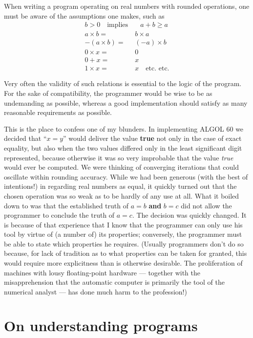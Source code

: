 When writing a program operating on real numbers with rounded operations, one must be aware of the assumptions one makes, such as
\begin{equation*}
	\begin{split}
		b > 0\quad \text{implies}&\quad a + b \geqslant a\\
		a\times b =&\ b\times a\\
		-(a \times  b) =&\ (-a)\times b\\
		0\times  x =&\ 0\\
		0 + x =&\ x\\
		1\times x =&\ x\quad\text{etc. etc.}
	\end{split}
\end{equation*}

Very often the validity of such relations is essential to the logic of the program. For the sake of compatibility, the programmer would be wise to be as undemanding as possible, whereas a good implementation should satisfy as many reasonable requirements as possible.

This is the place to confess one of my blunders. In implementing ALGOL 60 we decided that ``$x = y$'' would deliver the value \textbf{true} not only in the case of exact equality, but also when the two values differed only in the least significant digit represented, because otherwise it was so very improbable that the value \textit{true} would ever be computed. We were thinking of converging iterations that could oscillate within rounding accuracy. While we had been generous (with the best of intentions!) in regarding real numbers as equal, it quickly turned out that the chosen operation was so weak as to be hardly of any use at all. What it boiled down to was that the established truth of $a = b$ \textbf{and} $b = c$ did not allow the programmer to conclude the truth of $a = c$. The decision was quickly changed. It is because of that experience that I know that the programmer can only use his tool by virtue of (a number of) its properties; conversely, the programmer must be able to state which properties he requires. (Usually programmers don't do so because, for lack of tradition as to what properties can be taken for granted, this would require more explicitness than is otherwise desirable. The proliferation of machines with lousy floating-point hardware --- together with the misapprehension that the automatic computer is primarily the tool of the numerical analyst --- has done much harm to the profession!)

\section{On understanding programs}

